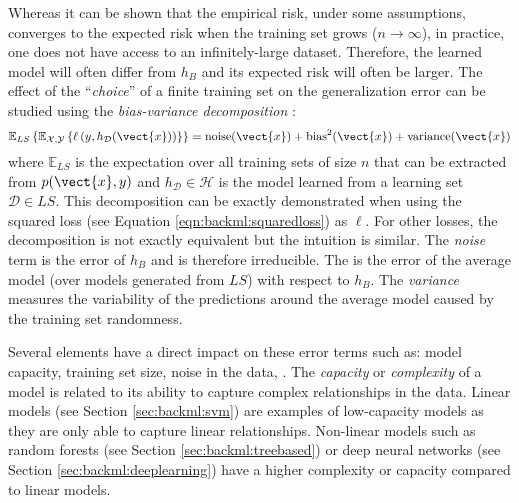 Whereas it can be shown that the empirical risk, under some assumptions, converges
to the expected risk when the training set grows ($n \rightarrow \infty$), in
practice, one does not have access to an infinitely-large dataset. Therefore, the
learned model will often differ from $h_B$ and its expected risk will often be
larger. The effect of the ``\textit{choice}'' of a finite training set on the
generalization error can be studied using the \textit{bias-variance decomposition} 
\cite{geman1992neural, geurts2009bias, hastie2017elements}:
\begin{equation}
\label{eqn:backml:biasvariancedec}
\mathbb{E}_{LS}\left\{\mathbb{E}_{\mathcal{X},\mathcal{Y}}\left\{\ell\left(y, h_{\mathcal{D}}(\vect{x})\right)\right\}\right\} = \text{noise}(\vect{x}) + \text{bias}^2(\vect{x}) + \text{variance}(\vect{x})
\end{equation}
where $\mathbb{E}_{LS}$ is the expectation over all training sets of size $n$ that
can be extracted from $p(\vect{x},y)$ and $h_{\mathcal{D}} \in \mathcal{H}$ is
the model learned from a learning set $\mathcal{D} \in LS$. This decomposition can
be exactly demonstrated when using the squared loss (see Equation 
\ref{eqn:backml:squaredloss}) as $\ell$. For other losses, the decomposition is not 
exactly equivalent but the intuition is similar. The \textit{noise}
term is the error of $h_B$ and is therefore irreducible. The  is the
error of the average model (over models generated from $LS$) with respect to $h_B$.
The \textit{variance} measures the variability of the predictions around the
average model caused by the training set randomness.

Several elements have a direct impact on these error terms such as: model capacity, 
training set size, noise in the data, \etc. The \textit{capacity} or 
\textit{complexity} of a model is related to its ability to capture complex relationships 
in the data. Linear models (see Section \ref{sec:backml:svm}) are examples of low-capacity 
models as they are only able to capture linear relationships. Non-linear models such as 
random forests (see Section \ref{sec:backml:treebased}) or deep neural networks 
(see Section \ref{sec:backml:deeplearning}) have a higher complexity or capacity 
compared to linear models.

